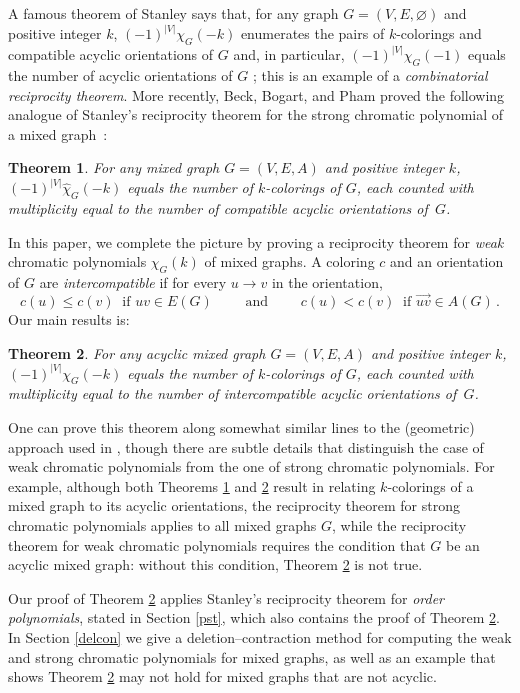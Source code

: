 \documentclass[11pt]{amsart}
\newtheorem{theorem}{Theorem}
\renewcommand\emptyset{\varnothing}
\begin{document}
A famous theorem of Stanley says that, for any graph $G=(V,E,\emptyset)$ and positive integer $k$, $(-1)^{|V|} \chi_G(-k)$
enumerates the pairs of $k$-colorings and compatible acyclic orientations of $G$ and, in particular, $(-1)^{|V|}
\chi_G(-1)$ equals the number of acyclic orientations of $G$ \cite{stanleyacyclic}; this is an example of a
\emph{combinatorial reciprocity theorem}.
More recently, Beck, Bogart, and Pham proved the following analogue of Stanley's reciprocity
theorem for the strong chromatic polynomial of a mixed graph~\cite{Golomb}:

\begin{theorem}\label{strongmg} 
For any mixed graph $G=(V,E,A)$ and positive integer $k$, $(-1)^{|V|} \widehat{\chi}_G(-k)$ equals the number of $k$-colorings of $G$, each counted with multiplicity equal to the number of compatible acyclic orientations of~$G$.
\end{theorem}

In this paper, we complete the picture by proving a reciprocity theorem for \emph{weak} chromatic polynomials $\chi_G(k)$ of mixed graphs. A coloring $c$ and an orientation of $G$ are \emph{intercompatible} if for every $u \to v$ in the orientation,
\[
  c(u) \le c(v) \ \text{ if } uv \in E(G)
  \qquad \text{ and } \qquad
  c(u)<c(v) \ \text{ if } \vec{uv} \in A(G) \, . 
\]
Our main results is:

\begin{theorem}\label{main}
For any acyclic mixed graph $G=(V,E,A)$ and positive integer $k$, $(-1)^{|V|} {\chi}_G(-k)$ equals the number of $k$-colorings of $G$, each counted with multiplicity equal to the number of intercompatible acyclic orientations of~$G$.
\end{theorem}

One can prove this theorem along somewhat similar lines to the (geometric) approach used in \cite{Golomb}, though there are subtle details that distinguish the case of weak chromatic
polynomials from the one of strong chromatic polynomials. For example, although both Theorems \ref{strongmg} and \ref{main} result in relating $k$-colorings of a mixed graph to its acyclic
orientations, the reciprocity theorem for strong chromatic polynomials applies to all mixed graphs $G$, while the reciprocity theorem for weak chromatic polynomials requires the condition
that $G$ be an acyclic mixed graph: without this condition, Theorem \ref{main} is not true.

Our proof of Theorem \ref{main} applies Stanley's reciprocity theorem for \emph{order polynomials}, stated in Section \ref{pst},
which also contains the proof of Theorem \ref{main}. In Section \ref{delcon} we give a deletion--contraction method for computing
the weak and strong chromatic polynomials for mixed graphs, as well as an example that shows Theorem \ref{main} may not hold for mixed graphs that are not acyclic.
\end{document}
